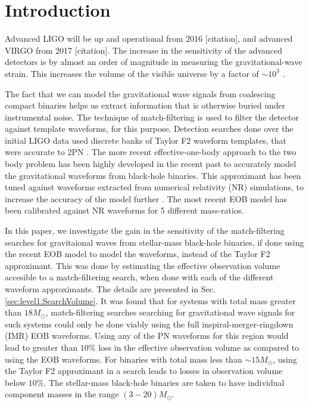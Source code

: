 \documentclass[aps,
prd,
amsmath,
amssymb,
twocolumn,
floatfix,
groupedaddress]{revtex4-1}
\begin{document}
\section{Introduction}\label{sec:level1:Introduction}
Advanced LIGO will be up and operational from 2016 [citation], and advanced VIRGO from 2017 [citation]. The increase in the sensitivity of the advanced detectors is by almost an order of magnitude in measuring the gravitational-wave strain. This increases the volume of the visible universe by a factor of $\sim10^3$ \citep{LSCCBCRates2010}.

The fact that we can model the gravitational wave signals from coalescing compact binaries helps us extract information that is otherwise buried under instrumental noise. The technique of match-filtering is used to filter the detector against template waveforms, for this purpose. Detection searches done over the initial LIGO data used discrete banks of Taylor F2 waveform templates, that were accurate to 2PN \citep{LSCSearch2004,LSCSearch2005,LSCSearch2008}. The more recent effective-one-body approach \citep{EOBOriginalBuonannoDamour} to the two body problem has been highly developed in the recent past \citep{EOBNR01,EOBNRdevel01,EOBNRdevel02,EOBNRdevel03,EOBNRdevel04,EOBdevel01,EOBdevel02} to accurately model the gravitational waveforms from black-hole binaries. This approximant has been tuned against waveforms extracted from numerical relativity (NR) simulations, to increase the accuracy of the model further \citep{EOBNRdevel01,EOBNRdevel02,EOBNRdevel03,EOBNRdevel04}. The most recent EOB model \citep{
BuonannoEOBv2Main} has been calibrated against NR waveforms for 5 different mass-ratios.

In this paper, we investigate the gain in the sensitivity of the match-filtering searches for gravitaional waves from stellar-mass black-hole binaries, if done using the recent EOB model \citep{BuonannoEOBv2Main} to model the waveforms, instead of the Taylor F2 approximant. This was done by estimating the effective observation volume accesible to a match-filtering search, when done with each of the different waveform approximants. The details are presented in Sec.\ref{sec:level1:SearchVolume}. It was found that for systems with total mass greater than $18M_{\odot}$, match-filtering searches searching for gravitational wave signals for such systems could only be done viably using the full inspiral-merger-ringdown (IMR) EOB waveforms. Using any of the PN waveforms for this region would lead to greater than $10\%$ loss in the effective observation volume as compared to using the EOB waveforms. For binaries with total mass less than $\sim15M_{\odot}$, using the Taylor F2 approximant in a search leads to losses 
in observation volume below $10\%$. The stellar-mass black-hole binaries are taken to have individual component masses in the range $(3-20)M_{\odot}$.\newline
\end{document}
